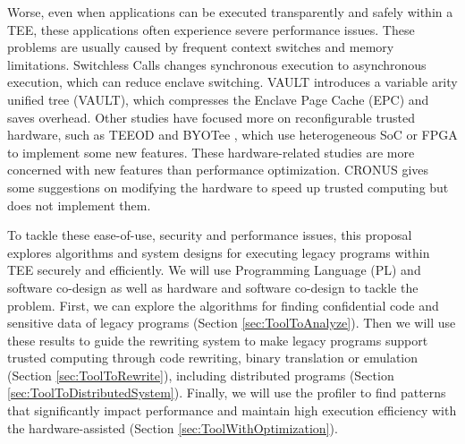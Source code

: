 Worse, even when applications can be executed transparently and safely within a TEE,
these applications often experience severe performance issues.
These problems are usually caused by frequent context switches and memory limitations.
Switchless Calls \cite{Tian2018SwitchlessCM} changes synchronous execution
to asynchronous execution, which can reduce enclave switching.
VAULT \cite{Taassori2018VAULTRP} introduces a variable arity unified tree (VAULT),
which compresses the Enclave Page Cache (EPC) and saves overhead.
Other studies have focused more on reconfigurable trusted hardware,
such as TEEOD \cite{Pereira2021TowardsAT} and BYOTee \cite{Armanuzzaman2022BYOTeeTB},
which use heterogeneous SoC or FPGA to implement some new features.
These hardware-related studies are more concerned with new features than
performance optimization. CRONUS \cite{Jiang2022CRONUSFS} gives some suggestions
on modifying the hardware to speed up trusted computing but does not
implement them.

To tackle these ease-of-use, security and performance issues, this proposal explores
algorithms and system designs for executing legacy programs within TEE securely and efficiently.
We will use Programming Language (PL) and software co-design as well as hardware and software co-design
to tackle the problem.
First, we can explore the algorithms for finding confidential code and sensitive data of
legacy programs (Section \ref{sec:ToolToAnalyze}). Then we will use these results
to guide the rewriting system to make legacy programs support trusted computing through
code rewriting, binary translation or emulation (Section \ref{sec:ToolToRewrite}),
including distributed programs (Section \ref{sec:ToolToDistributedSystem}).
Finally, we will use the profiler to find patterns that significantly impact
performance and maintain high execution efficiency with the hardware-assisted
(Section \ref{sec:ToolWithOptimization}).
